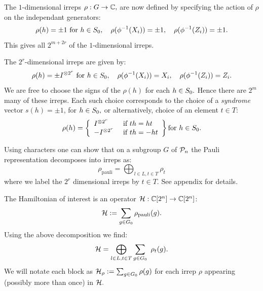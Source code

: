 \documentclass[12pt,notitlepage,longbibliography,nofootinbib,tightenlines]{revtex4}
\begin{document}
The $1$-dimensional irreps $\rho:G\to \mathbb{C},$
are now defined by
specifying the action of $\rho$ on the independant generators:
$$
    \rho(h)=\pm 1\ \mbox{for}\ h\in S_0,
    \quad \rho(\phi^{-1}(X_i)) = \pm 1,\quad \rho(\phi^{-1}(Z_i)) = \pm 1.
$$
This gives all $2^{m+2r}$ of the $1$-dimensional irreps.

The $2^r$-dimensional irreps are given by:
$$
    \rho(h) = \pm I^{\otimes 2^r}\ \mbox{for}\ h\in S_0,
    \quad \rho(\phi^{-1}(X_i)) = X_i,\quad \rho(\phi^{-1}(Z_i)) = Z_i.
$$
We are free to choose the signs of the $\rho(h)$ for each $h\in S_0.$
Hence there are $2^m$ many of these irreps.
Each such choice corresponds to the choice of a {\it syndrome} vector $s(h)=\pm 1$, for $h \in S_0,$
or alternatively, choice of an element $t\in T:$
$$
    \rho(h) = \left\{ \begin{array}{ll}
 I^{\otimes 2^r}\ &\mbox{if $th=ht$}\\
 -I^{\otimes 2^r}\ &\mbox{if $th=-ht$}\end{array} \right\}\mbox{for}\ h\in \Stab_0.
$$


Using characters one can show that
on a subgroup $G$ of $\mathcal{P}_n$ the
Pauli representation decomposes into irreps as:
$$
    \rho_{\mathrm{pauli}} = \bigoplus_{l\in L, t\in T} \rho_t
$$
where we label the $2^r$ dimensional irreps by $t\in T.$
See appendix for details.

The Hamiltonian of interest is 
an operator $\mathcal{H}:\mathbb{C}[2^n]\to\mathbb{C}[2^n]$:
$$ \mathcal{H} := \sum_{g\in G_0} \rho_{\mathrm{pauli}}(g).$$
Using the above decomposition we find:
$$
    \mathcal{H} = \bigoplus_{l\in L, t\in T} \sum_{g\in G_0}\ \rho_t(g).
$$
We will notate each block as
$\mathcal{H}_\rho := \sum_{g\in G_0}\rho(g)$
for each irrep $\rho$ appearing (possibly more than once)
in $\mathcal{H}.$
\end{document}
